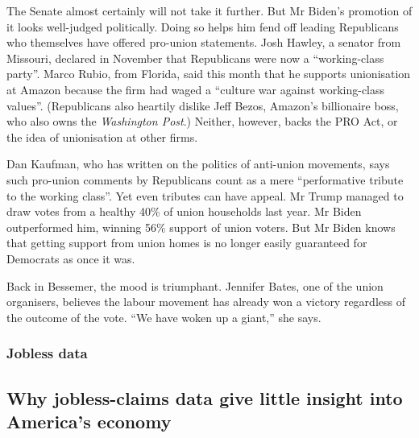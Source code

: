 \documentclass{article}
\begin{document}
The Senate almost certainly will not take it further. But Mr Biden's promotion of it looks well-judged politically. Doing so helps him fend off leading Republicans who themselves have offered pro-union statements. Josh Hawley, a senator from Missouri, declared in November that Republicans were now a ``working-class party''. Marco Rubio, from Florida, said this month that he supports unionisation at Amazon because the firm had waged a ``culture war against working-class values''. (Republicans also heartily dislike Jeff Bezos, Amazon's billionaire boss, who also owns the \emph{Washington Post}.) Neither, however, backs the PRO Act, or the idea of unionisation at other firms. 

Dan Kaufman, who has written on the politics of anti-union movements, says such pro-union comments by Republicans count as a mere ``performative tribute to the working class''. Yet even tributes can have appeal. Mr Trump managed to draw votes from a healthy 40\% of union households last year. Mr Biden outperformed him, winning 56\% support of union voters. But Mr Biden knows that getting support from union homes is no longer easily guaranteed for Democrats as once it was. 

Back in Bessemer, the mood is triumphant. Jennifer Bates, one of the union organisers, believes the labour movement has already won a victory regardless of the outcome of the vote. ``We have woken up a giant,'' she says. {} 
\clearpage
\subsubsection{Jobless data }
\subsection{Why jobless-claims data give little insight into America's economy }
\end{document}
